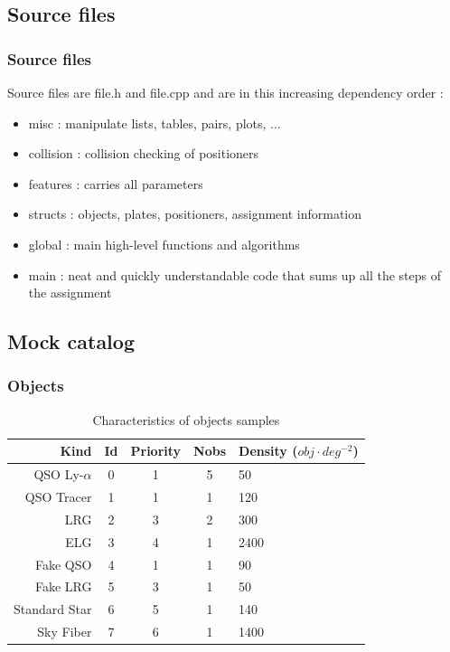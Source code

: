 \documentclass{beamer}
\def\psqd{$obj \cdot deg^{-2}$}
\begin{document}
\subsection{Source files}
\begin{frame}\frametitle{Source files}
	Source files are file.h and file.cpp and are in this increasing dependency order :
	\begin{itemize}
		\item misc : manipulate lists, tables, pairs, plots, ...
		\item collision : collision checking of positioners
		\item features : carries all parameters
		\item structs : objects, plates, positioners, assignment information
		\item global : main high-level functions and algorithms
		\item main : neat and quickly understandable code that sums up all the steps of the assignment
	\end{itemize}
\end{frame}

\subsection{Mock catalog}
\begin{frame}\frametitle{Objects}
	\begin{table}[H]\centering
		\begin{tabular}{rcccl} \hline
			Kind&Id&Priority&Nobs&Density (\psqd)\\ \hline
			QSO Ly-$\alpha$ & 0 & 1 & 5 & 50\\
			QSO Tracer & 1 & 1 & 1 & 120\\
			LRG & 2 & 3 & 2 & 300\\
			ELG & 3 & 4 & 1 & 2400\\
			Fake QSO & 4 & 1 & 1 & 90\\
			Fake LRG & 5 & 3 & 1 & 50\\
			Standard Star & 6 & 5 & 1 & 140\\
			Sky Fiber & 7 & 6 & 1 & 1400\\ \hline
		\end{tabular}
		\caption{Characteristics of objects samples} 
	\end{table}
\end{frame}
\end{document}
